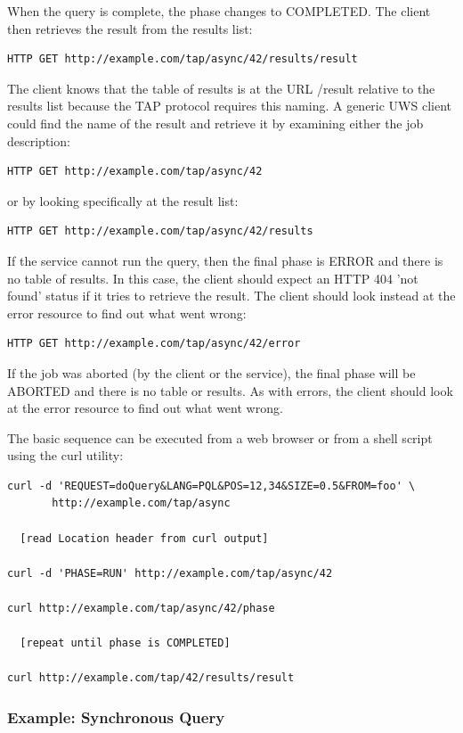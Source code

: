 \documentclass[11pt,a4paper]{ivoa}
\begin{document}
{When the query is complete, the phase changes to COMPLETED. The client then 
retrieves the result from the results list:
\begin{verbatim}
HTTP GET http://example.com/tap/async/42/results/result
\end{verbatim}
The client knows that the table of results is at the URL /result relative to the 
results list because the TAP protocol requires this naming. A generic UWS client 
could find the name of the result and retrieve it by examining either the job 
description:
\begin{verbatim}
HTTP GET http://example.com/tap/async/42
\end{verbatim}
or by looking specifically at the result list:
\begin{verbatim}
HTTP GET http://example.com/tap/async/42/results
\end{verbatim}
If the service cannot run the query, then the final phase is ERROR and there is 
no table of results. In this case, the client should expect an HTTP 404 'not 
found' status if it tries to retrieve the result. The client should look instead 
at the error resource to find out what went wrong:
\begin{verbatim}
HTTP GET http://example.com/tap/async/42/error
\end{verbatim}
If the job was aborted (by the client or the service), the final phase will be 
ABORTED and there is no table or results. As with errors, the client should look 
at the error resource to find out what went wrong.

The basic sequence can be executed from a web browser or from a shell script 
using the curl utility:
\begin{verbatim}
curl -d 'REQUEST=doQuery&LANG=PQL&POS=12,34&SIZE=0.5&FROM=foo' \
       http://example.com/tap/async

  [read Location header from curl output]

curl -d 'PHASE=RUN' http://example.com/tap/async/42

curl http://example.com/tap/async/42/phase

  [repeat until phase is COMPLETED]

curl http://example.com/tap/42/results/result
\end{verbatim}

\subsubsection{Example: Synchronous Query}

}
\end{document}
